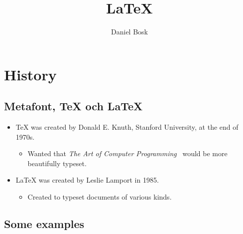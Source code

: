\title{%
  \LaTeX
}
\author{Daniel Bosk}


\mode*

\begin{abstract}
  
\end{abstract}


\section{History}

\subsection{Metafont, \TeX{} och \LaTeX}

\begin{frame}
  \begin{itemize}
    \item \TeX{} was created by Donald E. Knuth, Stanford University, at the 
      end of 1970s.
      \begin{itemize}
        \item Wanted that
          \emph{The Art of Computer Programming}~\cite{Knuth1997tao}
          would be more beautifully typeset.
      \end{itemize}
    \item \LaTeX{} was created by Leslie Lamport in 1985.
      \begin{itemize}
        \item Created to typeset documents of various kinds.
      \end{itemize}
  \end{itemize}
\end{frame}

\subsection{Some examples}

